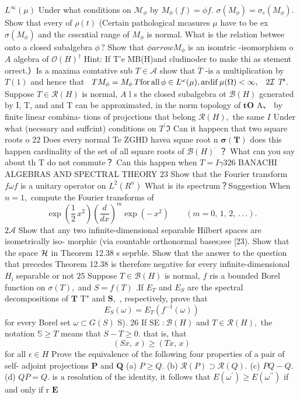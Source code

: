 $L^{\infty}(\mu)$ Under what conditions on ${\mathcal{M}}_{\phi}$ by $M_{\phi}(f)=\phi f.$ $\sigma(M_{\phi})=\sigma_{c}(M_{\phi}).$ Show that every of $\rho(t)$ (Certain pathological mcasures ${\mu}$ have to be ex $\sigma(M_{\phi})$ and thc csscntial range of $M_{\phi}$ is normal. What is the relation betwee onto a closed subalgebra $\phi\,?$ Show that $\phi arrow M_{\phi}$ is an isomtric -isomorphism o $\scriptstyle A$ algebra of ${\mathcal{O}}(H)^{\dagger}$ Hint: If T'e MB(H)and cludinoder to make thi as stement orrect.）Is a maxima comtative sub $\scriptstyle T\in{\mathcal{A}}$ show that $\overline{{T}}$ -is a multiplication by $\scriptstyle{T(1)}$ and hence that $\begin{array}{l c r}{{T M_{\phi}=M_{\phi}\,T\mathrm{for\,all}\,\phi\in L^{\omega}(\mu),\mathrm{ardif\,}\mu(\Omega)<\infty,}}\end{array}$ $2{\cal I}$ $T^{\mathfrak{s}}.$ Suppose $T\in{\mathcal{R}}(H)$ is normal, $\scriptstyle A$ l s the closed subalgebra ot ${\mathcal{B}}(H)$ gcnerated by I, T, and and T can be approximated, in the norm topology of ${\boldsymbol{t}}{\boldsymbol{O}}$ A、 by finite linear combina- tions of projcctions that belong ${\mathcal{R}}(H),$ the same $\boldsymbol{\mathit{I}}$ Under what (necssary and suffcint) conditions on $T^{\prime}{\mathfrak{I}}$ Can it happecn that two square roots o 22 Does every normal Te ZGHD havea squae root n ${\boldsymbol{\sigma}}({\boldsymbol{T}})$ does this happen cardinality of the set of all square roots of ${\mathcal{B}}(H)^{\cdot}$ ？ What can you say about th T do not commute？ Can this happen when $T=I\gamma$326 BANACHI ALGEBRAS AND SPECTRAL THEORY $23$ Show that the Fourier transform $f\omega f$ is a unitary operator on $L^{2}(R^{n})$ What is its spectrum？Suggestion When $n=1,$ compute the Fourier transforms of $$ \exp\left(\frac{1}{2}\,x^{2}\right)\left(\frac{d}{d x}\right)^{m}\exp\left(-\,x^{2}\right)\qquad(m=0,\,1,\,2,\,.\,.\,. ). $$ $2{\mathcal{A}}$ Show that any two infinite-dimensional separable Hilbert spaces are isometrically iso- morphic (via countable orthonormal bases;see [23). Show that the space ${\cal H}$ in Theorem 12.38 s seprble. Show that the answer to the question that precedes Theorem 12.38 is therefore negative for every infinite-dimensional $\textstyle H_{\mathrm{i}}$ separable or not $25$ Suppose $T\in{\mathcal{B}}(H)$ is normal, $\boldsymbol{\mathit{f}}$ ris a bounded Borel function on $\sigma(T),$ and $S=f(T)$ .If $E_{T}$ and $E_{S}$ are the spectral decompositions of ${\boldsymbol{T}}$ T" and ${\boldsymbol{S}},$ , respectively, prove that $$ E_{S}(\omega)=E_{T}(f^{-1}(\omega)) $$ for every Borel set $\omega\subset G(S)$ S). 26 If SE $:{\mathcal{B}}(H)$ and $T\in{\mathcal{R}}(H),$ the notation $\mathbb{S}\geq T$ means that $\scriptstyle S-T\geq0.$ that is, that $$ (S x,\,x)\geq(T x,\,x) $$ for all $\textstyle{\epsilon\in H}$ Prove the equivalence of the following four properties of a pair of self- adjoint projections ${\boldsymbol{P}}$ and ${\boldsymbol{Q}}$ (a) $P\geq Q.$ (b) ${\mathcal{R}}(P)\supset{\mathcal{R}}(Q).$ (c) $P Q-Q.$ (d) $Q P=Q.$ is a resolution of the identity, it follows that $E(\omega^{\prime})\geq E(\omega^{\prime\prime})$ if and only if r ${\boldsymbol{E}}$ 